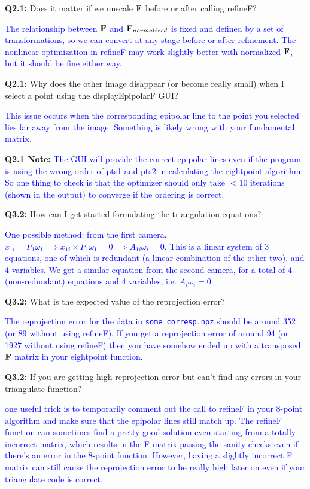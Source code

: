 \documentclass[11pt]{article}
\begin{document}
\noindent \textbf{Q2.1:} Does it matter if we unscale ${\bf F}$ before or after calling refineF?

\textcolor{blue}{\noindent The relationship between ${\bf F}$ and ${\bf F}_{normalized}$ is fixed and defined by a set of transformations, so we can convert at any stage before or after refinement. The nonlinear optimization in refineF may work slightly better with normalized ${\bf F}$, but it should be fine either way.}

\noindent \textbf{Q2.1:} Why does the other image disappear (or become really small) when I select a point using the displayEpipolarF GUI?

\textcolor{blue}{This issue occurs when the corresponding epipolar line to the point you selected lies far away from the image. Something is likely wrong with your fundamental matrix.}

\noindent \textbf{Q2.1 Note:} \textcolor{blue}{The GUI will provide the correct epipolar lines even if the program is using the wrong order of pts1 and pts2 in calculating the eightpoint algorithm. So one thing to check is that the optimizer should only take $<10$ iterations (shown in the output) to converge if the ordering is correct.}

\noindent \textbf{Q3.2:} How can I get started formulating the triangulation equations?

\textcolor{blue}{One possible method: from the first camera, $x_{1i}=P_1\omega_1 \implies x_{1i} \times P_1\omega_1=0\implies A_{1i}\omega_i=0$. This is a linear system of 3 equations, one of which is redundant (a linear combination of the other two), and 4 variables. We get a similar equation from the second camera, for a total of 4 (non-redundant) equations and 4 variables, i.e. $A_i\omega_i=0$.}

\noindent \textbf{Q3.2:} What is the expected value of the reprojection error?

\textcolor{blue}{The reprojection error for the data in \texttt{some\_corresp.npz} should be around 352 (or 89 without using refineF). If you get a reprojection error of around 94 (or 1927 without using refineF) then you have somehow ended up with a transposed ${\bf F}$ matrix in your eightpoint function.}

\noindent \textbf{Q3.2:} If you are getting high reprojection error but can't find any errors in your triangulate function? 

\textcolor{blue}{one useful trick is to temporarily comment out the call to refineF in your 8-point algorithm and make sure that the epipolar lines still match up. The refineF function can sometimes find a pretty good solution even starting from a totally incorrect matrix, which results in the F matrix passing the sanity checks even if there's an error in the 8-point function. However, having a slightly incorrect F matrix can still cause the reprojection error to be really high later on even if your triangulate code is correct.}
\end{document}
